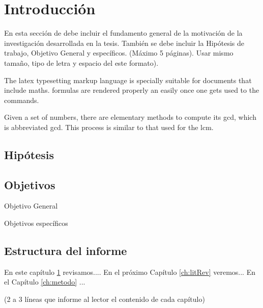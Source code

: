 
\chapter{Introducción}
\label{ch:intro} %

{\color{blue} En esta sección de debe incluir el fundamento general de la motivación de la investigación desarrollada en la tesis. También se debe incluir la Hipótesis de trabajo, Objetivo General y específicos. (Máximo 5 páginas). Usar mismo tamaño, tipo de letra y espacio del este formato).}

\vspace{0.5cm}

The \Gls{latex} typesetting markup language is specially suitable 
for documents that include \gls{maths}. \Glspl{formula} are 
rendered properly an easily once one gets used to the commands.

Given a set of numbers, there are elementary methods to compute 
its \acrlong{gcd}, which is abbreviated \acrshort{gcd}. This 
process is similar to that used for the \acrfull{lcm}.


\section{Hipótesis}


\section{Objetivos}

Objetivo General

Objetivos específicos


\section{Estructura del informe}

En este capítulo \ref{ch:intro} revisamos.... En el próximo Capítulo \ref{ch:litRev} veremos... En el Capítulo \ref{ch:metodo} ...

{\color{blue} (2 a 3 líneas que informe al lector el contenido de cada capítulo) }